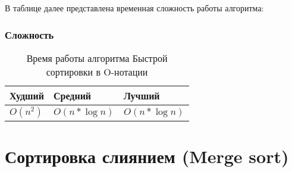 В таблице далее представлена временная сложность работы алгоритма:

		\subsubsection{Сложность}
\begin{table}[h!]
\caption{Время работы алгоритма Быстрой сортировки в O-нотации}
\begin{tabular}{|l|l|l|}
\hline
Худший & Средний & Лучший \\ \hline
$ O(n^{2}) $ & $ O(n*\log n) $ & $ O(n*\log n) $ \\\hline
\end{tabular}
\end{table}

\section{Сортировка слиянием (Merge sort)}

	\linenumbers
{}
\nolinenumbers